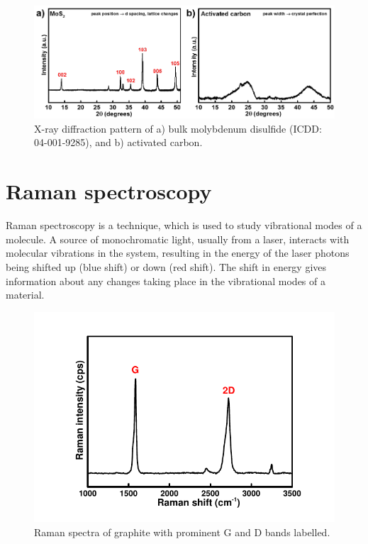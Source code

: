 \begin{figure}[tbh!]
\centering
\includegraphics[width=\textwidth]{Figures/chap2fig/XRD.pdf}
\caption{X-ray diffraction pattern of a) bulk molybdenum disulfide (ICDD: 04-001-9285), and b) activated carbon.}
\label{Figures/chap2fig:XRD}
\end{figure}

\section{Raman spectroscopy}
Raman spectroscopy is a technique, which is used to study vibrational modes of a molecule. A source of monochromatic light, usually from a laser, interacts with molecular vibrations in the system, resulting in the energy of the laser photons being shifted up (blue shift) or down (red shift). The shift in energy gives information about any changes taking place in the vibrational modes of a material. 
\begin{figure}[tbh!]
\centering
\includegraphics[width=\textwidth]{Figures/chap2fig/Raman.pdf}
\caption{Raman spectra of graphite with prominent G and D bands labelled.}
\label{Figures/chap2fig:Raman}
\end{figure}

